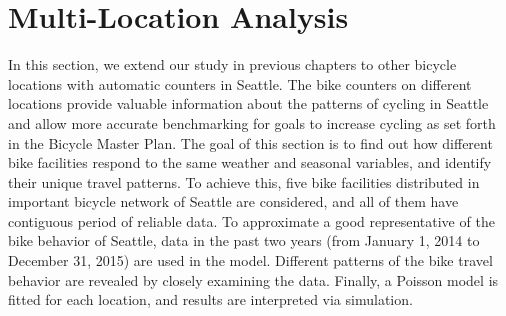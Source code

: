 \documentclass [11pt, proquest] {uwthesis}[2015/03/03]
\begin{document}













\chapter{Multi-Location Analysis}
\label{chp:multilocation}

In this section, we extend our study in previous chapters to other bicycle locations with automatic counters in Seattle. The bike counters on different locations provide valuable information about the patterns of cycling in Seattle and allow more accurate benchmarking for goals to increase cycling as set forth in the Bicycle Master Plan. The goal of this section is to find out how different bike facilities respond to the same weather and seasonal variables, and identify their unique travel patterns. To achieve this, five bike facilities distributed in important bicycle network of Seattle are considered, and all of them have contiguous period of reliable data. To approximate a good representative of the bike behavior of Seattle, data in the past two years (from January 1, 2014 to December 31, 2015) are used in the model. Different patterns of the bike travel behavior are revealed by closely examining the data. Finally, a Poisson model is fitted for each location, and results are interpreted via simulation.
\end{document}
